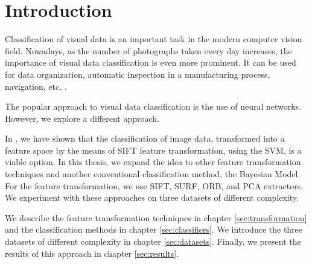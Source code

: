\chapter{Introduction}
Classification of visual data is an important task in the modern computer vision field. Nowadays, as the number of photographs taken every day increases, the importance of visual data classification is even more prominent. It can be used for data organization, automatic inspection in a manufacturing process, navigation, etc. \cite{wiki:Computer_vision}.

The popular approach to visual data classification is the use of neural networks. However, we explore a different approach.

In \cite{dornak2019}, we have shown that the classification of image data, transformed into a feature space by the means of SIFT feature transformation, using the SVM, is a viable option. In this thesis, we expand the idea to other feature transformation techniques and another conventional classification method, the Bayesian Model. For the feature transformation, we use SIFT, SURF, ORB, and PCA extractors. We experiment with these approaches on three datasets of different complexity.


We describe the feature transformation techniques in chapter \ref{sec:transformation} and the classification methods in chapter \ref{sec:classifiers}. We introduce the three datasets of different complexity in chapter \ref{sec:datasets}. Finally, we present the results of this approach in chapter \ref{sec:results}.
